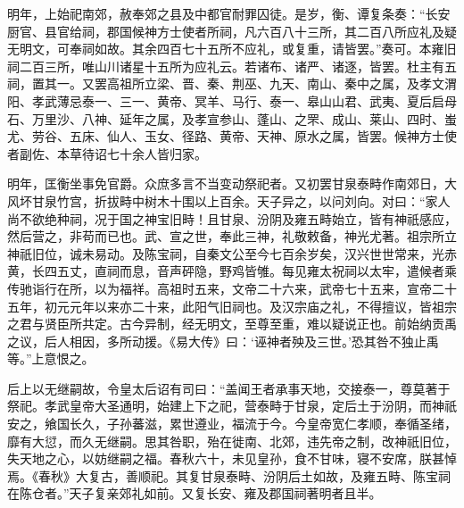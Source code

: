 \documentclass[12pt,UTF8]{ctexbook}
\begin{document}
明年，上始祀南郊，赦奉郊之县及中都官耐罪囚徒。是岁，衡、谭复条奏：“长安厨官、县官给祠，郡国候神方士使者所祠，凡六百八十三所，其二百八所应礼及疑无明文，可奉祠如故。其余四百七十五所不应礼，或复重，请皆罢。”奏可。本雍旧祠二百三所，唯山川诸星十五所为应礼云。若诸布、诸严、诸逐，皆罢。杜主有五祠，置其一。又罢高祖所立梁、晋、秦、荆巫、九天、南山、秦中之属，及孝文渭阳、孝武薄忌泰一、三一、黄帝、冥羊、马行、泰一、皋山山君、武夷、夏后启母石、万里沙、八神、延年之属，及孝宣参山、蓬山、之罘、成山、莱山、四时、蚩尤、劳谷、五床、仙人、玉女、径路、黄帝、天神、原水之属，皆罢。候神方士使者副佐、本草待诏七十余人皆归家。



明年，匡衡坐事免官爵。众庶多言不当变动祭祀者。又初罢甘泉泰畤作南郊日，大风坏甘泉竹宫，折拔畤中树木十围以上百余。天子异之，以问刘向。对曰：“家人尚不欲绝种祠，况于国之神宝旧畤！且甘泉、汾阴及雍五畤始立，皆有神祇感应，然后营之，非苟而已也。武、宣之世，奉此三神，礼敬敕备，神光尤著。祖宗所立神祇旧位，诚未易动。及陈宝祠，自秦文公至今七百余岁矣，汉兴世世常来，光赤黄，长四五丈，直祠而息，音声砰隐，野鸡皆雊。每见雍太祝祠以太牢，遣候者乘传驰诣行在所，以为福祥。高祖时五来，文帝二十六来，武帝七十五来，宣帝二十五年，初元元年以来亦二十来，此阳气旧祠也。及汉宗庙之礼，不得擅议，皆祖宗之君与贤臣所共定。古今异制，经无明文，至尊至重，难以疑说正也。前始纳贡禹之议，后人相因，多所动援。《易大传》曰：‘诬神者殃及三世。’恐其咎不独止禹等。”上意恨之。



后上以无继嗣故，令皇太后诏有司曰：“盖闻王者承事天地，交接泰一，尊莫著于祭祀。孝武皇帝大圣通明，始建上下之祀，营泰畤于甘泉，定后土于汾阴，而神祇安之，飨国长久，子孙蕃滋，累世遵业，福流于今。今皇帝宽仁孝顺，奉循圣绪，靡有大愆，而久无继嗣。思其咎职，殆在徙南、北郊，违先帝之制，改神祇旧位，失天地之心，以妨继嗣之福。春秋六十，未见皇孙，食不甘味，寝不安席，朕甚悼焉。《春秋》大复古，善顺祀。其复甘泉泰畤、汾阴后土如故，及雍五畤、陈宝祠在陈仓者。”天子复亲郊礼如前。又复长安、雍及郡国祠著明者且半。
\end{document}
